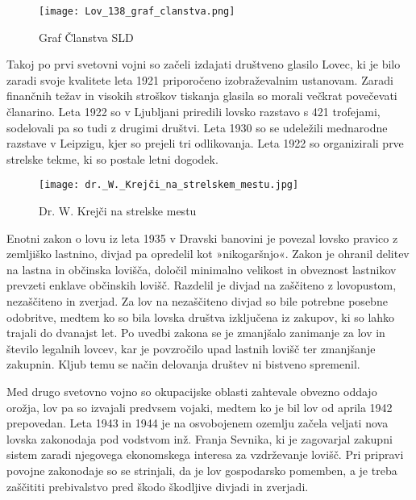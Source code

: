 \documentclass[a4paper,12pt,openright]{book}
\begin{document}
\begin{figure}[h!]
    \centering
    \captionsetup{skip=5pt}
    \texttt{[image: Lov\_138\_graf\_clanstva.png]}
    \caption{Graf Članstva SLD \cite[138]{Lov}}
    \label{fig:lov_138}
\end{figure}
\newpage

Takoj po prvi svetovni vojni so začeli izdajati društveno glasilo Lovec, ki je bilo zaradi svoje kvalitete leta 1921 priporočeno izobraževalnim ustanovam.
Zaradi finančnih težav in visokih stroškov tiskanja glasila so morali večkrat povečevati članarino.
Leta 1922 so v Ljubljani priredili lovsko razstavo s 421 trofejami, sodelovali pa so tudi z drugimi društvi.
Leta 1930 so se udeležili mednarodne razstave v Leipzigu, kjer so prejeli tri odlikovanja.
Leta 1922 so organizirali prve strelske tekme, ki so postale letni dogodek.\cite{Lov_129_149}

\begin{figure}[H]
    \centering
    \texttt{[image: dr.\_W.\_Krejči\_na\_strelskem\_mestu.jpg]}
    \caption{Dr. W. Krejči na strelske mestu \cite{bolcina_osebna}}
    \label{fig:dr_w_krejci}
\end{figure}

Enotni zakon o lovu iz leta 1935 v Dravski banovini je povezal lovsko pravico z zemljiško lastnino, divjad pa opredelil kot »nikogaršnjo«. 
Zakon je ohranil delitev na lastna in občinska lovišča, določil minimalno velikost in obveznost lastnikov prevzeti enklave občinskih lovišč. 
Razdelil je divjad na zaščiteno z lovopustom, nezaščiteno in zverjad. 
Za lov na nezaščiteno divjad so bile potrebne posebne odobritve, medtem ko so bila lovska društva izključena iz zakupov, ki so lahko trajali do dvanajst let. \cite{Lov_170_175}
Po uvedbi zakona se je zmanjšalo zanimanje za lov in število legalnih lovcev, kar je povzročilo upad lastnih lovišč ter zmanjšanje zakupnin. 
Kljub temu se način delovanja društev ni bistveno spremenil.\cite{Lov_176_178}

Med drugo svetovno vojno so okupacijske oblasti zahtevale obvezno oddajo orožja, lov pa so izvajali predvsem vojaki, medtem ko je bil lov od aprila 1942 prepovedan. 
Leta 1943 in 1944 je na osvobojenem ozemlju začela veljati nova lovska zakonodaja pod vodstvom inž. Franja Sevnika, ki je zagovarjal zakupni sistem zaradi njegovega ekonomskega interesa za vzdrževanje lovišč. 
Pri pripravi povojne zakonodaje so se strinjali, da je lov gospodarsko pomemben, a je treba zaščititi prebivalstvo pred škodo škodljive divjadi in zverjadi.\cite{Lov_197_201}
\end{document}
